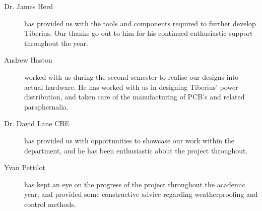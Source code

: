 \begin{description}
% 
\item [Dr. James Herd] has provided us with the tools and components required to further develop Tiberius. Our thanks go out to him for his continued enthusiastic support throughout the year.

\item [Andrew Haston] worked with us during the second semester to realise our designs into actual hardware. He has worked with us in designing Tiberius' power distribution, and taken care of the manufacturing of PCB's and related paraphernalia.

\item [Dr. David Lane CBE] has provided us with opportunities to showcase our work within the department, and he has been enthusiastic about the project throughout.

\item [Yvan Pettilot] has kept an eye on the progress of the project throughout the academic year, and provided some constructive advice regarding weatherproofing and control methods.



\end{description}
